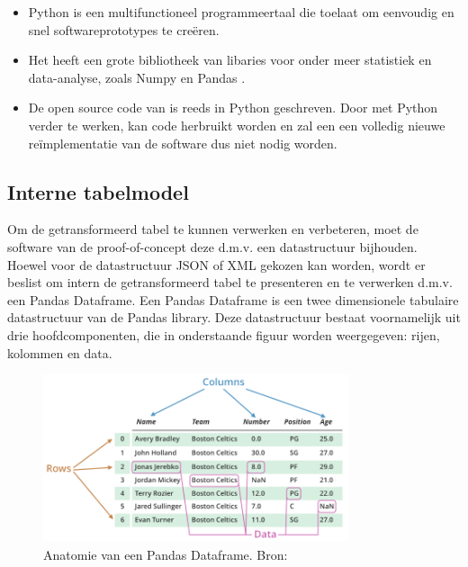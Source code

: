 \begin{itemize}
    \item Python is een multifunctioneel programmeertaal die toelaat om eenvoudig en snel softwareprototypes te creëren.\\

    \item Het heeft een grote bibliotheek van libaries voor onder meer statistiek en data-analyse, zoals Numpy \autocite{Oliphant2006} en Pandas \autocite{McKinney2010}.\\

    \item De open source code van \textcite{Prasad2020} is reeds in Python geschreven. Door met Python verder te werken, kan code herbruikt worden en zal een een volledig nieuwe reïmplementatie van de software dus niet nodig worden.
\end{itemize}

\subsection{Interne tabelmodel}

Om de getransformeerd tabel te kunnen verwerken en verbeteren, moet de software van de proof-of-concept deze d.m.v. een datastructuur bijhouden. Hoewel voor de datastructuur JSON of XML gekozen kan worden, wordt er beslist om intern de getransformeerd tabel te presenteren en te verwerken d.m.v. een Pandas Dataframe. Een Pandas Dataframe is een twee dimensionele tabulaire datastructuur van de Pandas library. Deze datastructuur bestaat voornamelijk uit drie hoofdcomponenten, die in onderstaande figuur worden weergegeven: rijen, kolommen en data.

\begin{figure}[H]
    \centering
    \includegraphics[width=0.8\textwidth]{img/pandas_dataframe.png}
    \caption{Anatomie van een Pandas Dataframe. Bron: \textcite{GeeksforGeeks2020}}
    \label{fig:anatomie-pandas-dataframe}
\end{figure}

